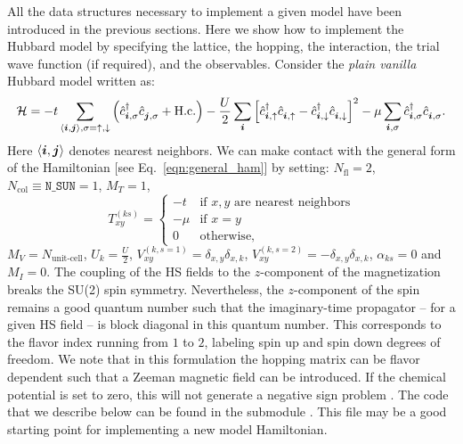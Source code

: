 

All the data structures necessary to implement a given model have been introduced in the previous sections. Here we show how to implement the Hubbard model  by specifying the lattice, the hopping, the interaction, the trial wave function  (if  required), and the observables.  Consider  the  \textit{plain vanilla}  Hubbard model  written as: 
\begin{equation}
\label{eqn_hubbard_Mz}
\mathcal{H}=
- t 
\sum\limits_{\langle \ve{i}, \ve{j} \rangle,  \sigma={\uparrow,\downarrow}} 
  \left(  \hat{c}^{\dagger}_{\ve{i}, \sigma} \hat{c}^{\phantom\dagger}_{\ve{j},\sigma}  + \hc \right) 
- \frac{U}{2}\sum\limits_{\ve{i}}\left[
\hat{c}^{\dagger}_{\ve{i}, \uparrow} \hat{c}^{\phantom\dagger}_{\ve{i}, \uparrow}  -   \hat{c}^{\dagger}_{\ve{i}, \downarrow} \hat{c}^{\phantom\dagger}_{\ve{i}, \downarrow}  \right]^{2}   
-  \mu \sum_{\ve{i},\sigma } \hat{c}^{\dagger}_{\ve{i}, \sigma}  \hat{c}^{\phantom\dagger}_{\ve{i},\sigma}. 
\end{equation} 
Here $ \langle \boldsymbol{i}, \boldsymbol{j} \rangle $    denotes nearest neighbors. 
We can make contact with the general form of the Hamiltonian  [see Eq.~\eqref{eqn:general_ham}] by setting: 
$N_{\mathrm{fl}} = 2$, $N_{\mathrm{col}} \equiv \texttt{N\_SUN}     =1 $, 
 $M_T    =    1$, 
 \begin{equation}
  T^{(ks)}_{x y}   = 
  \left\{ 
 \begin{array}{ll}
       -t         & \text{if } x,y \text{ are nearest neighbors} \\
       -\mu    & \text{if } x = y \\
       0         &  \text{otherwise},
 \end{array}
  \right.
 \end{equation}
 $M_V   =  N_{\text{unit-cell}} $,  $U_{k}       =   \frac{U}{2}$, 
 $V_{x y}^{(k, s=1)} =  \delta_{x,y} \delta_{x,k}  $,  $V_{x y}^{(k, s=2)} =  - \delta_{x,y} \delta_{x,k}  $,  $\alpha_{ks}   = 0  $ and $M_I       = 0 $.   
The coupling of the HS fields to the $z$-component of the magnetization breaks the SU(2) spin symmetry. Nevertheless, the $z$-component of the spin remains a good quantum number such that the imaginary-time propagator -- for a given HS field -- is block  diagonal in this quantum number. This corresponds to the flavor index running from $1$ to $2$,  labeling spin up and spin down degrees of freedom. We note that  in this formulation the  hopping matrix can be flavor dependent such that a Zeeman  magnetic field can be introduced.  If the chemical potential is set to zero, this will not generate a negative sign problem \cite{Wu04,Milat04,Bercx09}.    
The code that we describe below  can be found in the submodule . This file may be a good starting point for implementing a new model Hamiltonian. 

